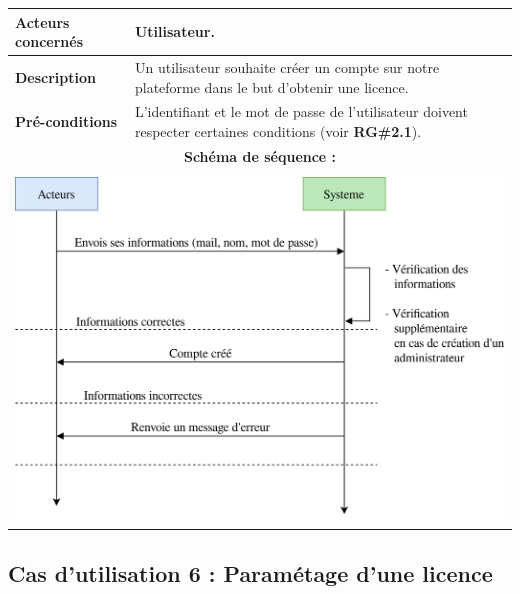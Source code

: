 \begin{table}[!h]
        \centering
        \begin{tabular}{| m{4cm} | m{12cm} |}
                \hline
		    \textbf{Acteurs concernés} & Utilisateur. \\
                \hline
		    \textbf{Description} & Un utilisateur souhaite créer un compte sur notre plateforme dans le but d'obtenir une licence. \\
                \hline
		    \textbf{Pré-conditions} & L'identifiant et le mot de passe de l'utilisateur doivent respecter certaines conditions (voir \textbf{RG\#2.1}).\\
		\hline
		    \multicolumn{2}{|c|}{\textbf{Schéma de séquence :}} \\
                \hline
                    \multicolumn{2}{|c|}{}\\
                    \multicolumn{2}{|c|}{\includegraphics[width=15cm]{main/png/seq_creation.png}} \\
                \hline
        \end{tabular}
        \label{tab:tab4}
\end{table}
\newpage

\subsection{Cas d'utilisation 6 : Paramétage d'une licence}

